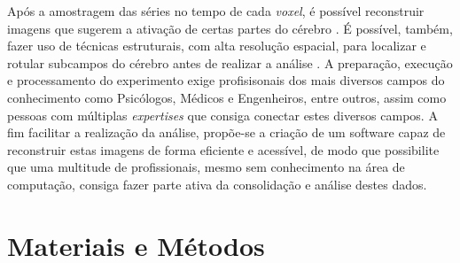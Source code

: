\documentclass[11pt,a4paper]{report}
\begin{document}
Após a amostragem das séries no tempo de cada \emph{voxel}, é possível reconstruir imagens que sugerem a ativação de certas partes do cérebro \cite{bullmore2009complex}. É possível, também, fazer uso de técnicas estruturais, com alta resolução espacial, para localizar e rotular subcampos do cérebro antes de realizar a análise \cite{cox2003functional}. A preparação, execução e processamento do experimento exige profisisonais dos mais diversos campos do conhecimento como Psicólogos, Médicos e Engenheiros, entre outros, assim como pessoas com múltiplas \emph{expertises} que consiga conectar estes diversos campos. A fim facilitar a realização da análise, propõe-se a criação de um software capaz de reconstruir estas imagens de forma eficiente e acessível, de modo que possibilite que uma multitude de profissionais, mesmo sem conhecimento na área de computação, consiga fazer parte ativa da consolidação e análise destes dados.

\section*{Materiais e Métodos}
\end{document}
